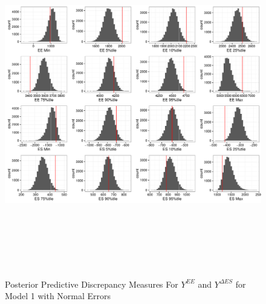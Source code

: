\documentclass[11pt]{article}\usepackage[]{graphicx}\usepackage[]{color}
\begin{document}
  \begin{figure}
  \centering
  \includegraphics[width=17cm,height=15cm]{manual_figure/wpydiag1.pdf}
  \caption{Posterior Predictive Discrepancy Measures For $Y^{EE}$ and $Y^{\Delta ES}$ for Model 1 with Normal Errors}
  \label{wpydiag1}
  \end{figure}
\end{document}
